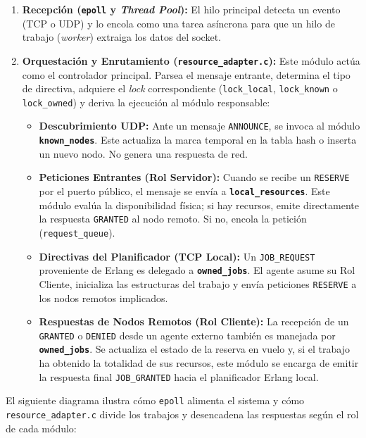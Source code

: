\documentclass[12pt,a4paper]{article}
\begin{document}
\begin{enumerate}
    \item \textbf{Recepción (\texttt{epoll} y \emph{Thread Pool}):} El hilo principal detecta un evento (TCP o UDP) y lo encola como una tarea asíncrona para que un hilo de trabajo (\emph{worker}) extraiga los datos del socket.
    \item \textbf{Orquestación y Enrutamiento (\texttt{resource\_adapter.c}):} Este módulo actúa como el controlador principal. Parsea el mensaje entrante, determina el tipo de directiva, adquiere el \emph{lock} correspondiente (\texttt{lock\_local}, \texttt{lock\_known} o \texttt{lock\_owned}) y deriva la ejecución al módulo responsable:
    \begin{itemize}
        \item \textbf{Descubrimiento UDP:} Ante un mensaje \texttt{ANNOUNCE}, se invoca al módulo \textbf{\texttt{known\_nodes}}. Este actualiza la marca temporal en la tabla hash o inserta un nuevo nodo. No genera una respuesta de red.
        \item \textbf{Peticiones Entrantes (Rol Servidor):} Cuando se recibe un \texttt{RESERVE} por el puerto público, el mensaje se envía a \textbf{\texttt{local\_resources}}. Este módulo evalúa la disponibilidad física; si hay recursos, emite directamente la respuesta \texttt{GRANTED} al nodo remoto. Si no, encola la petición (\texttt{request\_queue}).
        \item \textbf{Directivas del Planificador (TCP Local):} Un \texttt{JOB\_REQUEST} proveniente de Erlang es delegado a \textbf{\texttt{owned\_jobs}}. El agente asume su Rol Cliente, inicializa las estructuras del trabajo y envía peticiones \texttt{RESERVE} a los nodos remotos implicados.
        \item \textbf{Respuestas de Nodos Remotos (Rol Cliente):} La recepción de un \texttt{GRANTED} o \texttt{DENIED} desde un agente externo también es manejada por \textbf{\texttt{owned\_jobs}}. Se actualiza el estado de la reserva en vuelo y, si el trabajo ha obtenido la totalidad de sus recursos, este módulo se encarga de emitir la respuesta final \texttt{JOB\_GRANTED} hacia el planificador Erlang local.
    \end{itemize}
\end{enumerate}

El siguiente diagrama ilustra cómo \texttt{epoll} alimenta el sistema y cómo \texttt{resource\_adapter.c} divide los trabajos y desencadena las respuestas según el rol de cada módulo:
\end{document}
